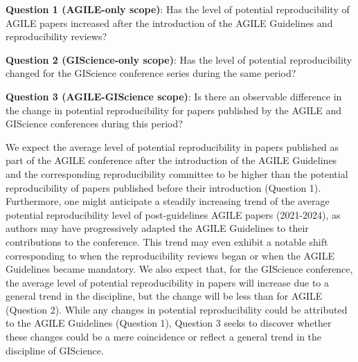 \documentclass{josis}
\begin{document}

\noindent \textbf{Question 1 (AGILE-only scope)}: Has the level of potential reproducibility of AGILE papers increased after the introduction of the AGILE Guidelines and reproducibility reviews?

\noindent \textbf{Question 2 (GIScience-only scope)}: Has the level of potential reproducibility changed for the GIScience conference series during the same period?

\noindent \textbf{Question 3 (AGILE-GIScience scope)}: Is there an observable difference in the change in potential reproducibility for papers published by the AGILE and GIScience conferences during this period?


We expect the average level of potential reproducibility in papers published as part of the AGILE conference after the introduction of the AGILE Guidelines and the corresponding reproducibility committee to be higher than the potential reproducibility of papers published before their introduction (Question 1). Furthermore, one might anticipate a steadily increasing trend of the average potential reproducibility level of post-guidelines AGILE papers (2021-2024), as authors may have progressively adapted the AGILE Guidelines to their contributions to the conference. This trend may even exhibit a notable shift corresponding to when the reproducibility reviews began or when the AGILE Guidelines became mandatory. %
We also expect that, for the GIScience conference, the average level of potential reproducibility in papers will increase due to a general trend in the discipline, but the change will be less than for AGILE (Question 2). 
While any changes in potential reproducibility could be attributed to the AGILE Guidelines (Question 1), Question 3 seeks to discover whether these changes could be a mere coincidence or reflect a general trend in the discipline of GIScience.
\end{document}
